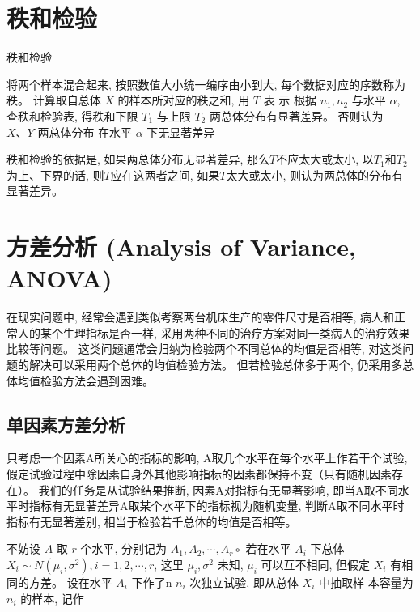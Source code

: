 \section{秩和检验}

\begin{algorithm}\caption{秩和检验}
将两个样本混合起来, 按照数值大小统一编序由小到大, 每个数据对应的序数称为秩。 \;
计算取自总体 \( X \) 的样本所对应的秩之和, 用 \( {T} \) 表 示\;
根据 \( {n}_{1}, {n}_{2} \) 与水平 \( \alpha \), 查秩和检验表, 得秩和下限 \( {T}_{1} \) 与上限 \( {T}_{{2}} \) \;
两总体分布有显著差异。 否则认为 \( X 、 Y \) 两总体分布
在水平 \( \alpha \) 下无显著差异\;
\end{algorithm}

秩和检验的依据是, 如果两总体分布无显著差异, 那么$T$不应太大或太小, 以$T_1$和$T_2$为上、下界的话, 则$T$应在这两者之间, 如果$T$太大或太小, 则认为两总体的分布有显著差异。 

\section{方差分析 (Analysis of Variance, ANOVA)}

在现实问题中, 经常会遇到类似考察两台机床生产的零件尺寸是否相等, 病人和正常人的某个生理指标是否一样, 采用两种不同的治疗方案对同一类病人的治疗效果比较等问题。 这类问题通常会归纳为检验两个不同总体的均值是否相等, 对这类问题的解决可以采用两个总体的均值检验方法。 但若检验总体多于两个, 仍采用多总体均值检验方法会遇到困难。 

\subsection{单因素方差分析}

只考虑一个因素A所关心的指标的影响, A取几个水平在每个水平上作若干个试验, 假定试验过程中除因素自身外其他影响指标的因素都保持不变（只有随机因素存在）。 我们的任务是从试验结果推断, 因素A对指标有无显著影响, 即当A取不同水平时指标有无显著差异A取某个水平下的指标视为随机变量, 判断A取不同水平时指标有无显著差别, 相当于检验若千总体的均值是否相等。 

不妨设 $A$ 取 $r$ 个水平, 分别记为 $A_{1}, A_{2}, \cdots, A_{r} \circ$ 若在水平 $A_{i}$ 下总体 $X_{i} \sim N\left(\mu_{i}, \sigma^{2}\right), i=1,2, \cdots, r$, 这里 $\mu_{i}, \sigma^{2}$ 未知, $\mu_{i}$ 可以互不相同, 但假定 $X_{i}$ 有相同的方差。  设在水平 $A_{i}$ 下作了n $n_{i}$ 次独立试验, 即从总体 $X_{i}$ 中抽取样 本容量为 $n_{i}$ 的样本, 记作

